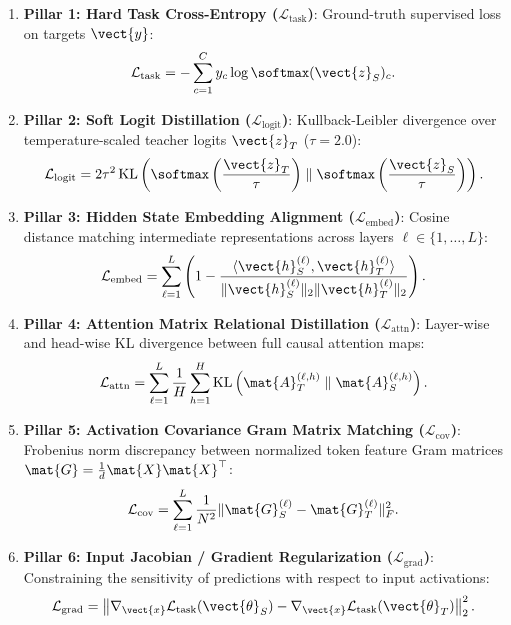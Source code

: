 \begin{enumerate}
    \item \textbf{Pillar 1: Hard Task Cross-Entropy ($\mathcal{L}_{\text{task}}$)}: Ground-truth supervised loss on targets $\vect{y}$:
    \begin{equation}
    \mathcal{L}_{\text{task}} = - \sum_{c=1}^C y_c \log \softmax(\vect{z}_S)_c.
    \end{equation}
    \item \textbf{Pillar 2: Soft Logit Distillation ($\mathcal{L}_{\text{logit}}$)}: Kullback-Leibler divergence over temperature-scaled teacher logits $\vect{z}_T$ ($\tau = 2.0$):
    \begin{equation}
    \mathcal{L}_{\text{logit}} = 2 \tau^2 \operatorname{KL}\left( \softmax\left(\frac{\vect{z}_T}{\tau}\right) \parallel \softmax\left(\frac{\vect{z}_S}{\tau}\right) \right).
    \end{equation}
    \item \textbf{Pillar 3: Hidden State Embedding Alignment ($\mathcal{L}_{\text{embed}}$)}: Cosine distance matching intermediate representations across layers $\ell \in \{1, \dots, L\}$:
    \begin{equation}
    \mathcal{L}_{\text{embed}} = \sum_{\ell=1}^L \left( 1 - \frac{\langle \vect{h}_S^{(\ell)}, \vect{h}_T^{(\ell)} \rangle}{\|\vect{h}_S^{(\ell)}\|_2 \|\vect{h}_T^{(\ell)}\|_2} \right).
    \end{equation}
    \item \textbf{Pillar 4: Attention Matrix Relational Distillation ($\mathcal{L}_{\text{attn}}$)}: Layer-wise and head-wise KL divergence between full causal attention maps:
    \begin{equation}
    \mathcal{L}_{\text{attn}} = \sum_{\ell=1}^L \frac{1}{H} \sum_{h=1}^H \operatorname{KL}\left( \mat{A}_T^{(\ell, h)} \parallel \mat{A}_S^{(\ell, h)} \right).
    \end{equation}
    \item \textbf{Pillar 5: Activation Covariance Gram Matrix Matching ($\mathcal{L}_{\text{cov}}$)}: Frobenius norm discrepancy between normalized token feature Gram matrices $\mat{G} = \frac{1}{d} \mat{X} \mat{X}^\top$:
    \begin{equation}
    \mathcal{L}_{\text{cov}} = \sum_{\ell=1}^L \frac{1}{N^2} \|\mat{G}_S^{(\ell)} - \mat{G}_T^{(\ell)}\|_F^2.
    \end{equation}
    \item \textbf{Pillar 6: Input Jacobian / Gradient Regularization ($\mathcal{L}_{\text{grad}}$)}: Constraining the sensitivity of predictions with respect to input activations:
    \begin{equation}
    \mathcal{L}_{\text{grad}} = \left\| \nabla_{\vect{x}} \mathcal{L}_{\text{task}}(\vect{\theta}_S) - \nabla_{\vect{x}} \mathcal{L}_{\text{task}}(\vect{\theta}_T) \right\|_2^2.
    \end{equation}
\end{enumerate}

